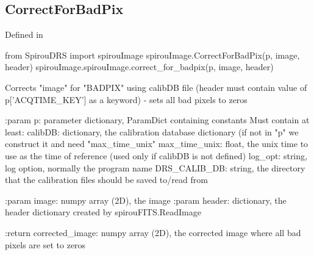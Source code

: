 \noindent\begin{minipage}{\textwidth}
\subsection{CorrectForBadPix}

Defined in \spirouImage{}

\begin{pythonbox}
from SpirouDRS import spirouImage
spirouImage.CorrectForBadPix(p, image, header)
spirouImage.spirouImage.correct_for_badpix(p, image, header)
\end{pythonbox}

\begin{pythondocstring}
Corrects "image" for "BADPIX" using calibDB file (header must contain
value of p['ACQTIME_KEY'] as a keyword) - sets all bad pixels to zeros

:param p: parameter dictionary, ParamDict containing constants
    Must contain at least:
            calibDB: dictionary, the calibration database dictionary
                     (if not in "p" we construct it and need "max_time_unix"
            max_time_unix: float, the unix time to use as the time of
                            reference (used only if calibDB is not defined)
            log_opt: string, log option, normally the program name
            DRS_CALIB_DB: string, the directory that the calibration
                          files should be saved to/read from

:param image: numpy array (2D), the image
:param header: dictionary, the header dictionary created by
               spirouFITS.ReadImage

:return corrected_image: numpy array (2D), the corrected image where all
                         bad pixels are set to zeros
\end{pythondocstring}
\end{minipage}


